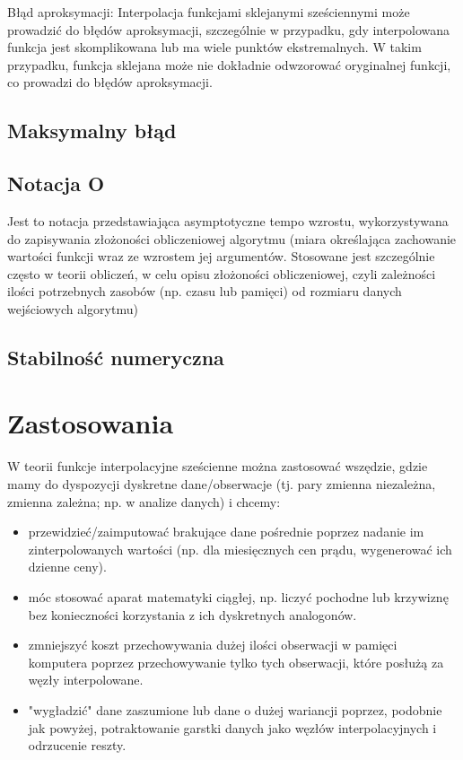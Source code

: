 \documentclass{article}
\begin{document}
Błąd aproksymacji: Interpolacja funkcjami sklejanymi sześciennymi może prowadzić do błędów aproksymacji, szczególnie w przypadku, gdy interpolowana funkcja jest skomplikowana lub ma wiele punktów ekstremalnych. W takim przypadku, funkcja sklejana może nie dokładnie odwzorować oryginalnej funkcji, co prowadzi do błędów aproksymacji.
\subsection{Maksymalny błąd}
\subsection{Notacja O}

Jest to notacja przedstawiająca asymptotyczne tempo wzrostu, wykorzystywana do zapisywania złożoności obliczeniowej algorytmu (miara określająca zachowanie wartości funkcji wraz ze wzrostem jej argumentów. Stosowane jest szczególnie często w teorii obliczeń, w celu opisu złożoności obliczeniowej, czyli zależności ilości potrzebnych zasobów (np. czasu lub pamięci) od rozmiaru danych wejściowych algorytmu) 


\subsection{Stabilność numeryczna}

\section{Zastosowania}
W teorii funkcje interpolacyjne sześcienne można zastosować wszędzie, gdzie mamy do dyspozycji dyskretne dane/obserwacje (tj. pary zmienna niezależna, zmienna zależna; np. w analize danych) i chcemy:
\begin{itemize}
    \item przewidzieć/zaimputować brakujące dane pośrednie poprzez nadanie im zinterpolowanych wartości (np. dla miesięcznych cen prądu, wygenerować ich dzienne ceny).
    \item móc stosować aparat matematyki ciągłej, np. liczyć pochodne lub krzywiznę bez konieczności korzystania z ich dyskretnych analogonów.
    \item zmniejszyć koszt przechowywania dużej ilości obserwacji w pamięci komputera poprzez przechowywanie tylko tych obserwacji, które posłużą za węzły interpolowane.
    \item "wygładzić" dane zaszumione lub dane o dużej wariancji poprzez, podobnie jak powyżej, potraktowanie garstki danych jako węzłów interpolacyjnych i odrzucenie reszty.
\end{itemize}
\end{document}
